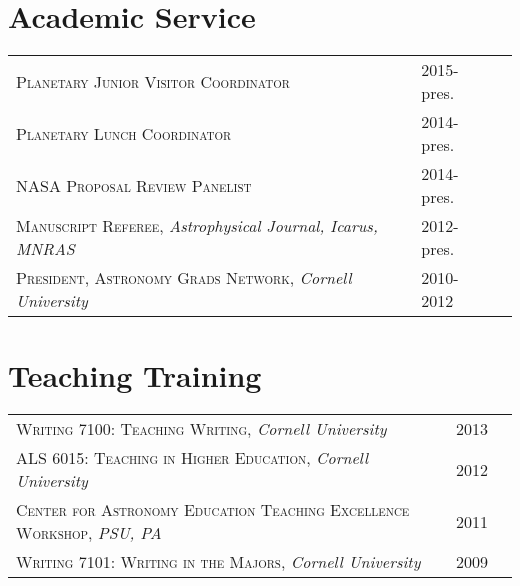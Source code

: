 \documentclass[10pt]{article} %
\begin{document}
{%

\section{Academic Service}

\begin{tabular}{l>{\hfill}p{5.8cm}r}
\textsc{Planetary Junior Visitor Coordinator} & 2015-pres. \\
\textsc{Planetary Lunch Coordinator} & 2014-pres. \\
\textsc{NASA Proposal Review Panelist} & 2014-pres.\\
\textsc{Manuscript Referee}, {\it Astrophysical Journal, Icarus, MNRAS} & 2012-pres.\\
\textsc{President, Astronomy Grads Network}, {\it Cornell University} & 2010-2012\\
\end{tabular}


\section{Teaching Training}

\begin{tabular}{l>{\hfill}p{2.1cm}r}
\textsc{Writing 7100:  Teaching Writing}, {\it Cornell University} & 2013 \\
\textsc{ALS 6015:  Teaching in Higher Education}, {\it Cornell University} & 2012\\
\textsc{Center for Astronomy Education Teaching Excellence Workshop}, {\it PSU, PA} & 2011 \\
\textsc{Writing 7101: Writing in the Majors}, {\it Cornell University} & 2009 \\
\end{tabular}



}
\end{document}
